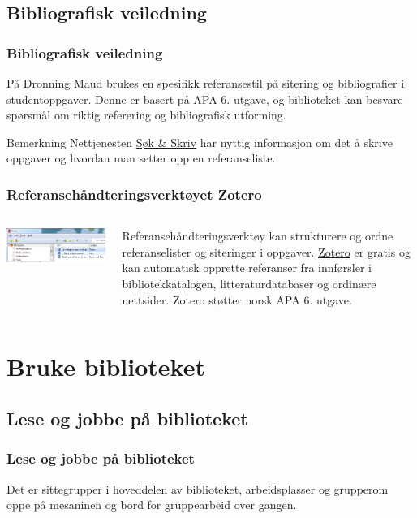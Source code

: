 \documentclass{beamer}
\begin{document}
\subsection{Bibliografisk veiledning}
\begin{frame}
  \frametitle{Bibliografisk veiledning}
  På Dronning Maud brukes en spesifikk \alert{referansestil} på sitering og bibliografier i studentoppgaver. Denne er basert på APA 6. utgave, og biblioteket kan besvare spørsmål om riktig referering og bibliografisk utforming.

  \vfill

  \begin{block}{Bemerkning}
    Nettjenesten \href{https://sokogskriv.no/}{Søk \& Skriv} har nyttig informasjon om det å skrive oppgaver og hvordan man setter opp en referanseliste.
  \end{block}
\end{frame}
\begin{frame}
  \frametitle{Referansehåndteringsverktøyet Zotero}
  \begin{columns}
    \includegraphics[width=1\textwidth]{media/zotero.png}
    
    Referansehåndteringsverktøy kan strukturere og ordne referanselister og siteringer i oppgaver. \href{https://dmmh.no/bibliotek/skriving-og-referering/zotero}{Zotero} er gratis og kan automatisk opprette referanser fra innførsler i bibliotekkatalogen, litteraturdatabaser og ordinære nettsider. Zotero støtter norsk APA 6. utgave.
  \end{columns}
\end{frame}

\section{Bruke biblioteket}
\subsection{Lese og jobbe på biblioteket}
\begin{frame}
  \frametitle{Lese og jobbe på biblioteket}
  Det er sittegrupper i hoveddelen av biblioteket, arbeidsplasser og grupperom oppe på mesaninen og bord for gruppearbeid over gangen.
\end{frame}
\end{document}
